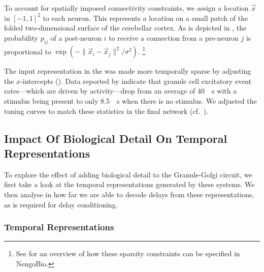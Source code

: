To account for spatially imposed connectivity constraints, we assign a location $\vec x$ in $[-1, 1]^2$ to each neuron.
This represents a location on a small patch of the folded two-dimensional surface of the cerebellar cortex.
As is depicted in , the probability $p_{ij}$ of a post-neuron $i$ to receive a connection from a pre-neuron $j$ is proportional to $\exp \left(- \| \vec x_i - \vec x_j \|^2 / \sigma^{2} \right)$.%
\footnote{See  for an overview of how these sparsity constraints can be specified in NengoBio.}

The input representation in the \PCN was made more temporally sparse by adjusting the $x$-intercepts ().
Data reported by \citet{chadderton2004integration} indicate that granule cell excitatory event rates---which are driven by \PCN activity---drop from an average of \SI{40}{\per\second} with a stimulus being present to only \SI{8.5}{\per\second} when there is no stimulus.
We adjusted the \PCN tuning curves to match these statistics in the final network (cf.~).


\subsection{Impact Of Biological Detail On Temporal Representations}

To explore the effect of adding biological detail to the Granule-Golgi circuit, we first take a look at the temporal representations generated by these systems.
We then analyse in how far we are able to decode delays from these representations, as is required for delay conditioning.

\subsubsection{Temporal Representations}

